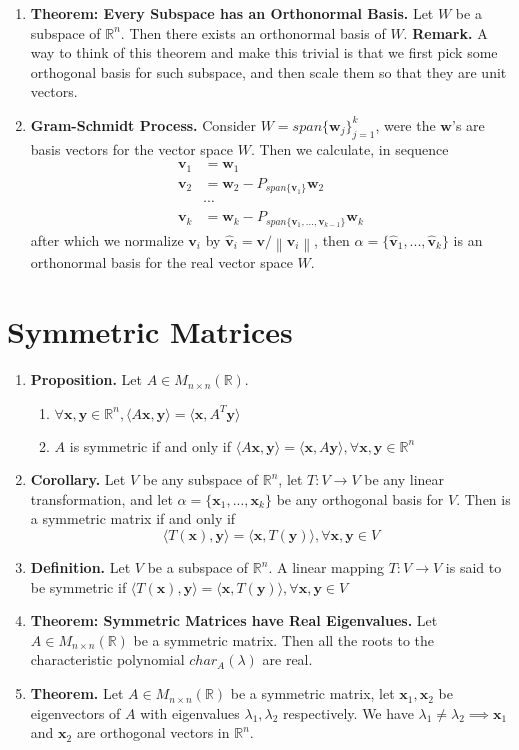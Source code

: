 \documentclass[oneside, 12pt]{book}
\newcommand{\settag}[1]{\renewcommand{\theenumi}{#1}}
\newcommand{\R}{\mathbb{R}}
\newcommand{\tbf}[1]{\textbf{#1}}
\newcommand{\trans}[3]{$#1:#2\rightarrow{}#3$}
\newcommand{\map}[3]{\text{$\left[#1\right]_{#2}^{#3}$}}
\newcommand{\mat}[2]{M_{#1 \times #2}(\R)}
\newcommand{\norm}[1]{\left\lVert#1\right\rVert}
\newcommand{\para}[1]{\item \tbf{#1}}
\newcommand{\vv}{\mathbf{v}}
\newcommand{\vw}{\mathbf{w}}
\newcommand{\vx}{\mathbf{x}}
\newcommand{\vy}{\mathbf{y}}
\begin{document}
\begin{enumerate}
    \settag{4.4.9}
    \para{Theorem: Every Subspace has an Orthonormal Basis.} Let $W$ be a subspace of $\R^n$. Then there exists an orthonormal basis of $W$. \newline 
    \textbf{Remark.} A way to think of this theorem and make this trivial is that we first pick some orthogonal basis for such subspace, and then scale them so that they are unit vectors.
    
    \settag{4.4.9*}
    \para{Gram-Schmidt Process.} Consider $W = span\{\vw_j\}_{j=1}^k$, were the $\vw$'s are basis vectors for the vector space $W$. Then we calculate, in sequence
    \begin{align*}
        \vv_1 &= \vw_1 \\
        \vv_2 &= \vw_2 - P_{span\{\vv_1\}}\vw_2 \\
              &\cdots  \\
        \vv_k &= \vw_k - P_{span\{\vv_1,...,\vv_{k-1}\}}\vw_k
    \end{align*}
    after which we normalize $\vv_i$ by $\hat{\vv}_i = \vv / \norm{\vv_i}$, then $\alpha = \{\hat{\vv}_1,...,\hat{\vv}_k\}$ is an orthonormal basis for the real vector space $W$.
\end{enumerate}

\section{Symmetric Matrices}
\begin{enumerate}
    \settag{4.5.2a}
    \para{Proposition.} Let $A \in \mat{n}{n}$.
    \begin{enumerate}
        \item $\forall \vx,\vy \in \R^n, \langle A\vx,\vy\rangle = \langle \vx, A^T\vy\rangle$
        \item $A$ is symmetric if and only if $\langle A\vx,\vy\rangle = \langle \vx,A\vy \rangle, \forall \vx, \vy \in \R^n$
    \end{enumerate}
    
    \settag{4.5.2b}
    \para{Corollary.} Let $V$ be any subspace of $\R^n$, let \trans{T}{V}{V} be any linear transformation, and let $\alpha = \{\vx_1,...,\vx_k\}$ be any orthogonal basis for $V$. Then \map{T}{\alpha}{\alpha} is a symmetric matrix if and only if $$\langle T(\vx), \vy\rangle = \langle \vx,T(\vy)\rangle, \forall \vx, \vy \in V$$
    
    \settag{4.5.3}
    \para{Definition.} Let $V$ be a subspace of $\R^n$. A linear mapping \trans{T}{V}{V} is said to be symmetric if $\langle T(\vx),\vy\rangle = \langle \vx, T(\vy) \rangle, \forall \vx, \vy \in V$
    
    \settag{4.5.6}
    \para{Theorem: Symmetric Matrices have Real Eigenvalues.} Let $A \in \mat{n}{n}$ be a symmetric matrix. Then all the roots to the characteristic polynomial $char_A(\lambda)$ are real.
    
    \settag{4.5.7}
    \para{Theorem.} Let $A \in \mat{n}{n}$ be a symmetric matrix, let $\vx_1, \vx_2$ be eigenvectors of $A$ with eigenvalues $\lambda_1, \lambda_2$ respectively. We have $\lambda_1 \neq \lambda_2 \implies \vx_1$ and $\vx_2$ are orthogonal vectors in $\R^n$.
\end{enumerate}
\end{document}
